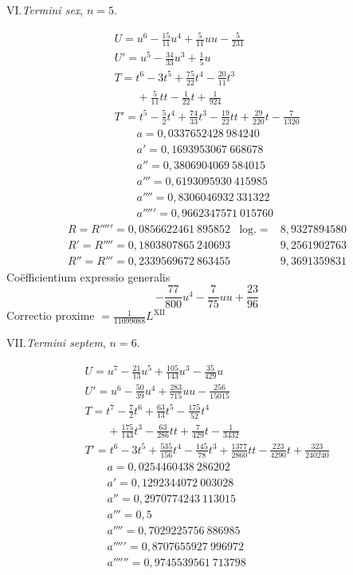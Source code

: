 \clearpage\begin{center}VI.\quad\textit{Termini sex}, \(n=5\).\end{center}
\[
\begin{array}{l}
U=u^6-\frac{15}{11}u^4+\frac{5}{11}uu-\frac{5}{231}\\
U'=u^5-\frac{34}{33}u^3+\frac{1}{5}u\\
T=t^6-3t^5+\frac{75}{22}t^4-\frac{20}{11}t^3\\\qquad+\frac{5}{11}tt-\frac{1}{22}t+\frac{1}{924}\\
T'=t^5-\frac{5}{2}t^4+\frac{74}{33}t^3-\frac{19}{22}tt+\frac{29}{220}t-\frac{7}{1320}\\
\qquad a=0{,}0337652428\ 984240\\
\qquad a'=0{,}1693953067\ 668678\\
\qquad a''=0{,}3806904069\ 584015\\
\qquad a'''=0{,}6193095930\ 415985\\
\qquad a''''=0{,}8306046932\ 331322\\
\qquad a'''''=0{,}9662347571\ 015760
\end{array}
\]
\[
\begin{array}{lll}
R=R'''''=0{,}0856622461\ 895852&\mathrm{log.}=&8{,}9327894580\\
R'=R''''=0{,}1803807865\ 240693&&9{,}2561902763\\
R''=R'''=0{,}2339569672\ 863455&&9{,}3691359831
\end{array}
\]
\noindent Co\"efficientium expressio generalis
\[
-\frac{77}{800}u^4-\frac{7}{75}uu+\frac{23}{96}
\]
\noindent Correctio proxime \(=\frac{1}{11099088}L^{\mathrm{XII}}\)
\endgroup
{}
\begingroup\renewcommand{\arraystretch}{1.6}
\clearpage\begin{center}VII.\quad\textit{Termini septem}, \(n=6\).\end{center}
\[
\begin{array}{l}
U=u^7-\frac{21}{13}u^5+\frac{105}{143}u^3-\frac{35}{429}u\\
U'=u^6-\frac{50}{39}u^4+\frac{283}{715}uu-\frac{256}{15015}\\
T=t^7-\frac{7}{2}t^6+\frac{63}{13}t^5-\frac{175}{52}t^4\\\qquad+\frac{175}{143}t^3-\frac{63}{286}tt+\frac{7}{429}t-\frac{1}{3432}\\
T'=t^6-3t^5+\frac{535}{156}t^4-\frac{145}{78}t^3+\frac{1377}{2860}tt-\frac{223}{4290}t+\frac{323}{240240}\\
\qquad a=0{,}0254460438\ 286202\\
\qquad a'=0{,}1292344072\ 003028\\
\qquad a''=0{,}2970774243\ 113015\\
\qquad a'''=0{,}5\\
\qquad a''''=0{,}7029225756\ 886985\\
\qquad a'''''=0{,}8707655927\ 996972\\
\qquad a''''''=0{,}9745539561\ 713798
\end{array}
\]
